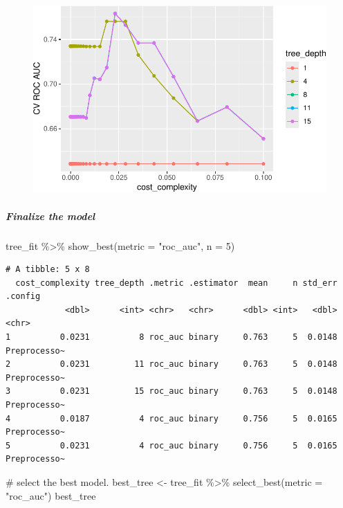 \documentclass[
]{article}
\let\oldsubparagraph\subparagraph
\renewcommand{\subparagraph}[1]{\oldsubparagraph{#1}\mbox{}}
\newenvironment{Shaded}{\begin{snugshade}}{\end{snugshade}}
\newcommand{\AttributeTok}[1]{\textcolor[rgb]{0.40,0.45,0.13}{#1}}
\newcommand{\CommentTok}[1]{\textcolor[rgb]{0.37,0.37,0.37}{#1}}
\newcommand{\DecValTok}[1]{\textcolor[rgb]{0.68,0.00,0.00}{#1}}
\newcommand{\FunctionTok}[1]{\textcolor[rgb]{0.28,0.35,0.67}{#1}}
\newcommand{\NormalTok}[1]{\textcolor[rgb]{0.00,0.23,0.31}{#1}}
\newcommand{\OtherTok}[1]{\textcolor[rgb]{0.00,0.23,0.31}{#1}}
\newcommand{\SpecialCharTok}[1]{\textcolor[rgb]{0.37,0.37,0.37}{#1}}
\newcommand{\StringTok}[1]{\textcolor[rgb]{0.13,0.47,0.30}{#1}}
\begin{document}
\begin{figure}[H]

{\centering \includegraphics{hw4_files/figure-pdf/unnamed-chunk-27-1.pdf}

}

\end{figure}

\hypertarget{finalize-the-model-2}{%
\subparagraph{Finalize the model}\label{finalize-the-model-2}}

\begin{Shaded}
\begin{Highlighting}[]
\NormalTok{tree\_fit }\SpecialCharTok{\%\textgreater{}\%}
  \FunctionTok{show\_best}\NormalTok{(}\AttributeTok{metric =} \StringTok{"roc\_auc"}\NormalTok{, }\AttributeTok{n =} \DecValTok{5}\NormalTok{)  }
\end{Highlighting}
\end{Shaded}

\begin{verbatim}
# A tibble: 5 x 8
  cost_complexity tree_depth .metric .estimator  mean     n std_err .config     
            <dbl>      <int> <chr>   <chr>      <dbl> <int>   <dbl> <chr>       
1          0.0231          8 roc_auc binary     0.763     5  0.0148 Preprocesso~
2          0.0231         11 roc_auc binary     0.763     5  0.0148 Preprocesso~
3          0.0231         15 roc_auc binary     0.763     5  0.0148 Preprocesso~
4          0.0187          4 roc_auc binary     0.756     5  0.0165 Preprocesso~
5          0.0231          4 roc_auc binary     0.756     5  0.0165 Preprocesso~
\end{verbatim}

\begin{Shaded}
\begin{Highlighting}[]
\CommentTok{\# select the best model.}
\NormalTok{best\_tree }\OtherTok{\textless{}{-}}\NormalTok{ tree\_fit }\SpecialCharTok{\%\textgreater{}\%}
  \FunctionTok{select\_best}\NormalTok{(}\AttributeTok{metric =} \StringTok{"roc\_auc"}\NormalTok{)}
\NormalTok{best\_tree }
\end{Highlighting}
\end{Shaded}
\end{document}

